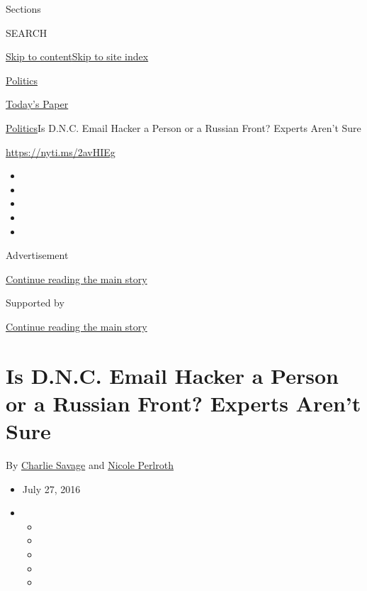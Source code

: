 Sections

SEARCH

\protect\hyperlink{site-content}{Skip to
content}\protect\hyperlink{site-index}{Skip to site index}

\href{https://www.nytimes.com/section/politics}{Politics}

\href{https://myaccount.nytimes.com/auth/login?response_type=cookie\&client_id=vi}{}

\href{https://www.nytimes.com/section/todayspaper}{Today's Paper}

\href{/section/politics}{Politics}\textbar{}Is D.N.C. Email Hacker a
Person or a Russian Front? Experts Aren't Sure

\url{https://nyti.ms/2avHIEg}

\begin{itemize}
\item
\item
\item
\item
\item
\end{itemize}

Advertisement

\protect\hyperlink{after-top}{Continue reading the main story}

Supported by

\protect\hyperlink{after-sponsor}{Continue reading the main story}

\hypertarget{is-dnc-email-hacker-a-person-or-a-russian-front-experts-arent-sure}{%
\section{Is D.N.C. Email Hacker a Person or a Russian Front? Experts
Aren't
Sure}\label{is-dnc-email-hacker-a-person-or-a-russian-front-experts-arent-sure}}

By \href{http://www.nytimes.com/by/charlie-savage}{Charlie Savage} and
\href{http://www.nytimes.com/by/nicole-perlroth}{Nicole Perlroth}

\begin{itemize}
\item
  July 27, 2016
\item
  \begin{itemize}
  \item
  \item
  \item
  \item
  \item
  \end{itemize}
\end{itemize}

